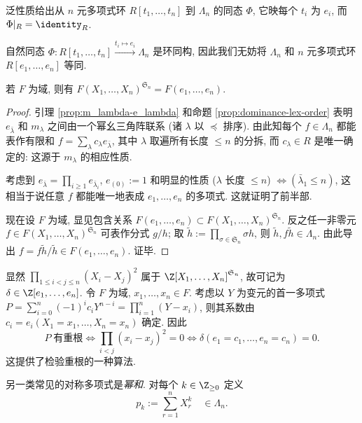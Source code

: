 泛性质给出从 $n$ 元多项式环 $R[t_1, \ldots, t_n]$ 到 $\Lambda_n$ 的同态 $\Phi$, 它映每个 $t_i$ 为 $e_i$, 而 $\Phi|_R = \identity_R$.
\begin{theorem}[对称多项式基本定理]\label{prop:fund-thm-symmetric-poly}
	自然同态 $\Phi: R[t_1, \ldots, t_n] \xrightarrow{t_i \mapsto e_i} \Lambda_n$ 是环同构, 因此我们无妨将 $\Lambda_n$ 和 $n$ 元多项式环 $R[e_1, \ldots, e_n]$ 等同.
	
	若 $F$ 为域, 则有 $F(X_1, \ldots, X_n)^{\mathfrak{S}_n} = F(e_1, \ldots, e_n)$.
\end{theorem}
\begin{proof}
	引理 \ref{prop:m_lambda-e_lambda} 和命题 \ref{prop:dominance-lex-order} 表明 $e_{\bar{\lambda}}$ 和 $m_\lambda$ 之间由一个幂幺三角阵联系 (诸 $\lambda$ 以 $\preceq$ 排序). 由此知每个 $f \in \Lambda_n$ 都能表作有限和 $f = \sum_\lambda c_\lambda e_{\bar{\lambda}}$, 其中 $\lambda$ 取遍所有长度 $\leq n$ 的分拆, 而 $c_\lambda \in R$ 是唯一确定的: 这源于 $m_\lambda$ 的相应性质.
	
	考虑到 $e_{\bar{\lambda}} = \prod_{i \geq 1} e_{\bar{\lambda}_i}$, $e_{(0)} := 1$ 和明显的性质 ($\lambda$ 长度 $\leq n$) $\iff (\bar{\lambda}_1 \leq n)$, 这相当于说任意 $f$ 都能唯一地表成 $e_1, \ldots, e_n$ 的多项式. 这就证明了前半部.
	
	现在设 $F$ 为域, 显见包含关系 $F(e_1, \ldots, e_n) \subset F(X_1, \ldots, X_n)^{\mathfrak{S}_n}$. 反之任一非零元 $f \in F(X_1, \ldots, X_n)^{\mathfrak{S}_n}$ 可表作分式 $g/h$; 取 $\tilde{h} := \prod_{\sigma \in \mathfrak{S}_n} \sigma h$, 则 $\tilde{h}, f\tilde{h} \in \Lambda_n$. 由此导出 $f = f\tilde{h}/\tilde{h} \in F(e_1, \ldots, e_n)$. 证毕.
\end{proof}

\begin{example}[判别式]\label{eg:polynomial-discriminant} 
	显然 $\displaystyle\prod_{1 \leq i < j \leq n} (X_i - X_j)^2$ 属于 $\Z[X_1, \ldots, X_n]^{\mathfrak{S}_n}$, 故可记为 $\delta \in \Z[e_1, \ldots, e_n]$. 令 $F$ 为域, $x_1, \ldots, x_n \in F$. 考虑以 $Y$ 为变元的首一多项式 $P = \sum_{i=0}^n (-1)^i c_i Y^{n-i} = \prod_{i=1}^n (Y - x_i)$, 则其系数由 $c_i = e_i(X_1 = x_1, \ldots, X_n = x_n)$ 确定. 因此
	\[ P\; \text{有重根} \iff \prod_{i < j} (x_i - x_j)^2 = 0 \iff \delta(e_1 = c_1, \ldots, e_n = c_n) = 0. \]
	这提供了检验重根的一种算法.
\end{example}

另一类常见的对称多项式是\emph{幂和}. 对每个 $k \in \Z_{\geq 0}$ 定义 
\[ p_k := \sum_{r=1}^n X_r^k \quad \in \Lambda_n. \]

